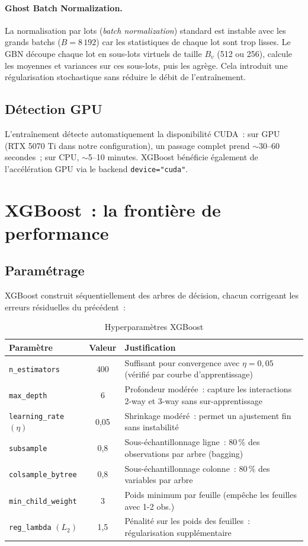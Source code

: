 \documentclass[12pt, a4paper, twoside, openright]{report}
\theoremstyle{definition}
\begin{document}
\paragraph{Ghost Batch Normalization.} La normalisation par lots (\emph{batch normalization}) standard est instable avec les grands batchs ($B = 8\,192$) car les statistiques de chaque lot sont trop lisses. Le GBN découpe chaque lot en sous-lots virtuels de taille $B_v$ (512 ou 256), calcule les moyennes et variances sur ces sous-lots, puis les agrège. Cela introduit une régularisation stochastique sans réduire le débit de l'entraînement.

\subsection{Détection GPU}

L'entraînement détecte automatiquement la disponibilité CUDA~: sur GPU (RTX 5070 Ti dans notre configuration), un passage complet prend $\sim$30--60 secondes~; sur CPU, $\sim$5--10 minutes. XGBoost bénéficie également de l'accélération GPU via le backend \texttt{device="cuda"}.

\section{XGBoost~: la frontière de performance}
\label{sec:pd:xgb}

\subsection{Paramétrage}

XGBoost \citep{chen_guestrin2016} construit séquentiellement des arbres de décision, chacun corrigeant les erreurs résiduelles du précédent~:

\begin{table}[htbp]
\centering
\caption{Hyperparamètres XGBoost}
\label{tab:xgb-config}
\begin{tabular}{lcp{6cm}}
\toprule
Paramètre & Valeur & Justification \\
\midrule
\texttt{n\_estimators} & 400 & Suffisant pour convergence avec $\eta = 0{,}05$ (vérifié par courbe d'apprentissage) \\
\texttt{max\_depth} & 6 & Profondeur modérée~: capture les interactions 2-way et 3-way sans sur-apprentissage \\
\texttt{learning\_rate} $(\eta)$ & 0{,}05 & Shrinkage modéré~: permet un ajustement fin sans instabilité \\
\texttt{subsample} & 0{,}8 & Sous-échantillonnage ligne~: 80\,\% des observations par arbre (bagging) \\
\texttt{colsample\_bytree} & 0{,}8 & Sous-échantillonnage colonne~: 80\,\% des variables par arbre \\
\texttt{min\_child\_weight} & 3 & Poids minimum par feuille (empêche les feuilles avec 1-2 obs.) \\
\texttt{reg\_lambda} $(L_2)$ & 1{,}5 & Pénalité sur les poids des feuilles~: régularisation supplémentaire \\
\bottomrule
\end{tabular}
\end{table}
\end{document}
